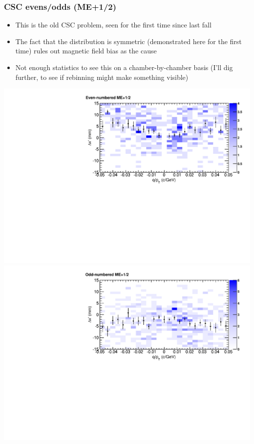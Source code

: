 \documentclass[compress]{beamer}
\begin{document}
\begin{frame}
\frametitle{CSC evens/odds (ME+1/2)}

\begin{itemize}
\item This is the old CSC problem, seen for the first time since last fall
\item The fact that the distribution is symmetric (demonstrated here for the first
  time) rules out magnetic field bias as the cause
\item Not enough statistics to see this on a chamber-by-chamber basis
  (I'll dig further, to see if rebinning might make something visible)
\end{itemize}

\vfill
{\mbox{\hspace{-1 cm}}\begin{minipage}{1.17\linewidth}
\includegraphics[width=0.5\linewidth]{endcapmep12_evens.pdf}
\includegraphics[width=0.5\linewidth]{endcapmep12_odds.pdf}
\end{minipage}}
\end{frame}
\end{document}
